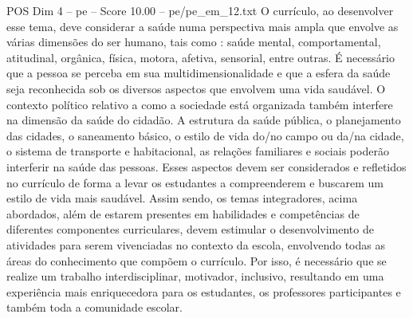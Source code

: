 \begin{textsample}{POS Dim 4 – pe – Score 10.00 – pe/pe\_em\_12.txt}
O currículo, ao desenvolver esse tema, deve considerar a saúde numa perspectiva mais ampla que envolve as várias dimensões do ser humano, tais como : saúde mental, comportamental, atitudinal, orgânica, física, motora, afetiva, sensorial, entre outras.
É necessário que a pessoa se perceba em sua multidimensionalidade e que a esfera da saúde seja reconhecida sob os diversos aspectos que envolvem uma vida saudável.
O contexto político relativo a como a sociedade está organizada também interfere na dimensão da saúde do cidadão.
A estrutura da saúde pública, o planejamento das cidades, o saneamento básico, o estilo de vida do/no campo ou da/na cidade, o sistema de transporte e habitacional, as relações familiares e sociais poderão interferir na saúde das pessoas.
Esses aspectos devem ser considerados e refletidos no currículo de forma a levar os estudantes a compreenderem e buscarem um estilo de vida mais saudável.
Assim sendo, os temas integradores, acima abordados, além de estarem presentes em habilidades e competências de diferentes componentes curriculares, devem estimular o desenvolvimento de atividades para serem vivenciadas no contexto da escola, envolvendo todas as áreas do conhecimento que compõem o currículo.
Por isso, é necessário que se realize um trabalho interdisciplinar, motivador, inclusivo, resultando em uma experiência mais enriquecedora para os estudantes, os professores participantes e também toda a comunidade escolar.

\end{textsample}
